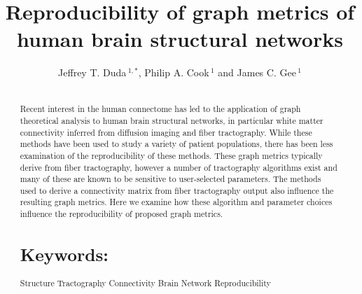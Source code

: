 \documentclass{frontiersSCNS} %
\def\journal{Neurosciences}
\def\firstAuthorLast{Duda {et~al}} %
\def\Authors{Jeffrey T. Duda\,$^{1,*}$, Philip A. Cook\,$^{1}$ and James C. Gee\,$^1$}
\begin{document}
\onecolumn
{}

\title[Reproducibility of structural graph metrics]{Reproducibility of graph metrics of human brain structural networks}
\author[\firstAuthorLast ]{\Authors}
\address{}
\correspondance{}
\editor{}

\maketitle
\begin{abstract}

\section{}
Recent interest in the human connectome has led to the application of graph theoretical analysis to human brain structural networks, in particular white matter connectivity inferred from diffusion imaging and fiber tractography. While these methods have been used to study a variety of patient populations, there has been less examination of the reproducibility of these methods. These graph metrics typically derive from fiber tractography, however a number of tractography algorithms exist and many of these are known to be sensitive to user-selected parameters. The methods used to derive a connectivity matrix from fiber tractography output also influence the resulting graph metrics. Here we examine how these algorithm and parameter choices influence the reproducibility of proposed graph metrics. 



\tiny
  \section{Keywords:} Structure Tractography Connectivity Brain Network Reproducibility  %
\end{abstract}
\end{document}
